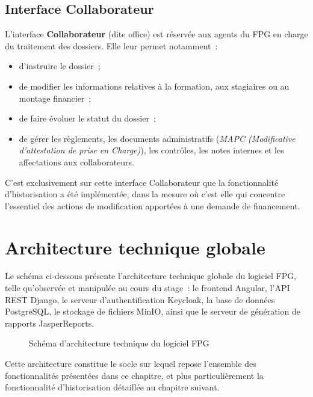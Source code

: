 \subsection{Interface Collaborateur}

L'interface \textbf{Collaborateur} (dite \og{}office\fg{}) est réservée
aux agents du FPG en charge du traitement des dossiers. Elle leur permet
notamment~:

\begin{itemize}
  \item d'instruire le dossier~;
  \item de modifier les informations relatives à la formation, aux
        stagiaires ou au montage financier~;
  \item de faire évoluer le statut du dossier~;
  \item de gérer les règlements, les documents administratifs
        (\textit{MAPC (Modificative d'attestation de prise en Charge)}), les contrôles, les notes internes et les
        affectations aux collaborateurs.
\end{itemize}

C'est exclusivement sur cette interface Collaborateur que la
fonctionnalité d'historisation a été implémentée, dans la mesure où
c'est elle qui concentre l'essentiel des actions de modification
apportées à une demande de financement.

\section{Architecture technique globale}

Le schéma ci-dessous présente l'architecture technique globale du
logiciel FPG, telle qu'observée et manipulée au cours du stage~: le
frontend Angular, l'API REST Django, le serveur d'authentification
Keycloak, la base de données PostgreSQL, le stockage de fichiers MinIO,
ainsi que le serveur de génération de rapports JasperReports.

\begin{figure}[H]
  \centering
  \caption{Schéma d'architecture technique du logiciel FPG}
  \label{fig:architecture-fpg}
\end{figure}

Cette architecture constitue le socle sur lequel repose l'ensemble des
fonctionnalités présentées dans ce chapitre, et plus particulièrement la
fonctionnalité d'historisation détaillée au chapitre suivant.

